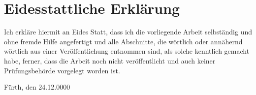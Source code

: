 


\section*{Eidesstattliche Erklärung}

 Ich erkläre hiermit an Eides Statt, dass ich die vorliegende Arbeit selbständig und ohne fremde Hilfe angefertigt und alle Abschnitte, die wörtlich oder annähernd wörtlich aus einer Veröffentlichung entnommen sind, als solche kenntlich gemacht habe, ferner, dass die Arbeit noch nicht veröffentlicht und auch keiner Prüfungsbehörde vorgelegt worden ist.

\bigskip
\noindent
 Fürth, den 24.12.0000
